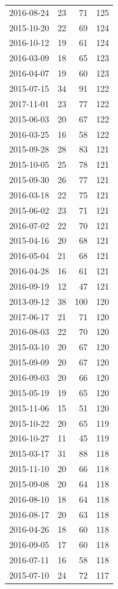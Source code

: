 \begin{tabular}{lrrr}
2016-08-24 & 23 & 71 & 125 \\
2015-10-20 & 22 & 69 & 124 \\
2016-10-12 & 19 & 61 & 124 \\
2016-03-09 & 18 & 65 & 123 \\
2016-04-07 & 19 & 60 & 123 \\
2015-07-15 & 34 & 91 & 122 \\
2017-11-01 & 23 & 77 & 122 \\
2015-06-03 & 20 & 67 & 122 \\
2016-03-25 & 16 & 58 & 122 \\
2015-09-28 & 28 & 83 & 121 \\
2015-10-05 & 25 & 78 & 121 \\
2015-09-30 & 26 & 77 & 121 \\
2016-03-18 & 22 & 75 & 121 \\
2015-06-02 & 23 & 71 & 121 \\
2016-07-02 & 22 & 70 & 121 \\
2015-04-16 & 20 & 68 & 121 \\
2016-05-04 & 21 & 68 & 121 \\
2016-04-28 & 16 & 61 & 121 \\
2016-09-19 & 12 & 47 & 121 \\
2013-09-12 & 38 & 100 & 120 \\
2017-06-17 & 21 & 71 & 120 \\
2016-08-03 & 22 & 70 & 120 \\
2015-03-10 & 20 & 67 & 120 \\
2015-09-09 & 20 & 67 & 120 \\
2016-09-03 & 20 & 66 & 120 \\
2015-05-19 & 19 & 65 & 120 \\
2015-11-06 & 15 & 51 & 120 \\
2015-10-22 & 20 & 65 & 119 \\
2016-10-27 & 11 & 45 & 119 \\
2015-03-17 & 31 & 88 & 118 \\
2015-11-10 & 20 & 66 & 118 \\
2015-09-08 & 20 & 64 & 118 \\
2016-08-10 & 18 & 64 & 118 \\
2016-08-17 & 20 & 63 & 118 \\
2016-04-26 & 18 & 60 & 118 \\
2016-09-05 & 17 & 60 & 118 \\
2016-07-11 & 16 & 58 & 118 \\
2015-07-10 & 24 & 72 & 117 \\

\end{tabular}

